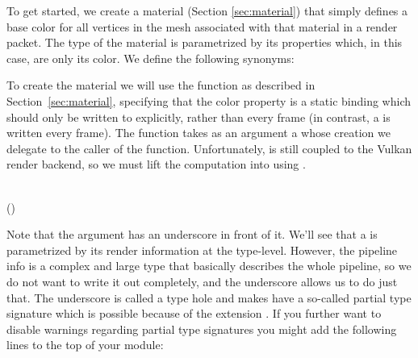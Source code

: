 To get started, we create a material (Section \ref{sec:material}) that simply
defines a base color for all vertices in the mesh associated with that material
in a render packet. The type of the material is parametrized by its properties
which, in this case, are only its color. We define the following synonyms:

\resethooks

To create the material we will use the  function as described in
Section~\ref{sec:material}, specifying that the color property is a static
binding which should only be written to explicitly, rather than every frame (in
contrast, a  is written every frame). The  function
takes as an argument a  whose creation we delegate to the
caller of the  function. Unfortunately,  is still coupled
to the Vulkan render backend, so we must lift the  computation into
 using .

\begin{hscode}\SaveRestoreHook
{}%
%
\>[B]{}\mathbin{::}\to {}\to {}\;\<[E]%
\\
\>[B]{}\;\;\mathrel{=}\mathbin{\$}\;(\;)\;\<[E]%
\ColumnHook
\end{hscode}\resethooks

Note that the  argument has an underscore in front of it. We'll
see that a  is parametrized by its render information at the
type-level. However, the pipeline info is a complex and large type that
basically describes the whole pipeline, so we do not want to write it out
completely, and the underscore allows us to do just that. The underscore is
called a type hole and makes  have a so-called partial type signature
which is possible because of the extension . If you
further want to disable warnings regarding partial type signatures you might
add the following lines to the top of your module:

